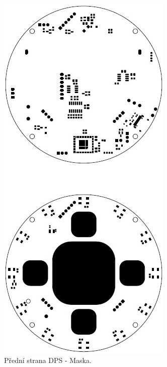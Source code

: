 \begin{figure}[!h]
	\begin{center}
	  \includegraphics[scale=1.1]{obrazky/Vyrobni_podkady_F_Mask.jpg}
	\end{center}
	\caption[Přední strana DPS - Maska]{Přední strana DPS - Maska.}
\end{figure}

